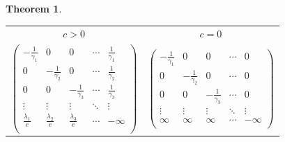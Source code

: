\documentclass[a1,portrait]{a0poster}
\newtheorem*{teorema}{Theorem}
\begin{document}
\begin{textblock}{15}
\begin{teorema}
    \begin{center}
      \begin{tabular}{cc}
        $c > 0$ & $c = 0$\\
        $
        \left(
          \begin{array}{ccccc}
            -\frac{1}{\gamma_1} & 0 & 0 & \cdots & \frac{1}{\gamma_1}\\
            0 & -\frac{1}{\gamma_2} & 0 & \cdots & \frac{1}{\gamma_2}\\
            0 & 0 & -\frac{1}{\gamma_3} & \cdots & \frac{1}{\gamma_3}\\
            \vdots & \vdots & \vdots & \ddots & \vdots \\
            \frac{\lambda_1}{c} & \frac{\lambda_2}{c} &
            \frac{\lambda_3}{c} & \cdots & -\infty\\
          \end{array}
        \right)
        $&$
        \left(
          \begin{array}{ccccc}
            -\frac{1}{\gamma_1} & 0 & 0 & \cdots & 0\\
            0 & -\frac{1}{\gamma_2} & 0 & \cdots & 0\\
            0 & 0 & -\frac{1}{\gamma_3} & \cdots & 0\\
            \vdots & \vdots & \vdots & \ddots & \vdots \\
            \infty & \infty & \infty & \cdots & -\infty\\
          \end{array}
        \right)
        $
      \end{tabular}
    \end{center}
  \end{teorema}
\end{textblock}
\end{document}

